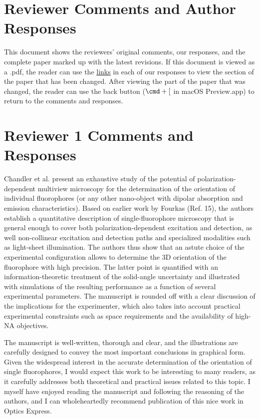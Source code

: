 \documentclass[10pt]{article}
\begin{document}
\section*{Reviewer Comments and Author Responses}\hypertarget{test}{}

This document shows the {\color{OE}reviewers' original comments}, our responses,
and the complete paper marked up with the latest revisions. If this document is
viewed as a .pdf, the reader can use the
\hyperlink{test}{{\color{urlblue}links}} in each of our responses to view the
section of the paper that has been changed. After viewing the part of the paper
that was changed, the reader can use the back button ($\cmd + [$ in macOS
Preview.app) to return to the comments and responses.

\section*{Reviewer 1 Comments and Responses}

{\color{OE} Chandler et al. present an exhaustive study of the potential of
  polarization- dependent multiview microscopy for the determination of the
  orientation of individual fluorophores (or any other nano-object with dipolar
  absorption and emission characteristics). Based on earlier work by Fourkas
  (Ref. 15), the authors establish a quantitative description of
  single-fluorophore microscopy that is general enough to cover both
  polarization-dependent excitation and detection, as well non-collinear
  excitation and detection paths and specialized modalities such as light-sheet
  illumination. The authors thus show that an astute choice of the experimental
  configuration allows to determine the 3D orientation of the fluorophore with
  high precision. The latter point is quantified with an information-theoretic
  treatment of the solid-angle uncertainty and illustrated with simulations of
  the resulting performance as a function of several experimental
  parameters. The manuscript is rounded off with a clear discussion of the
  implications for the experimenter, which also takes into account practical
  experimental constraints such as space requirements and the availability of
  high-NA objectives.}

{\color{OE} The manuscript is well-written, thorough and clear, and the
  illustrations are carefully designed to convey the most important conclusions
  in graphical form.  Given the widespread interest in the accurate
  determination of the orientation of single fluorophores, I would expect this
  work to be interesting to many readers, as it carefully addresses both
  theoretical and practical issues related to this topic. I myself have enjoyed
  reading the manuscript and following the reasoning of the authors, and I can
  wholeheartedly recommend publication of this
  nice work in Optics Express.}
\end{document}

